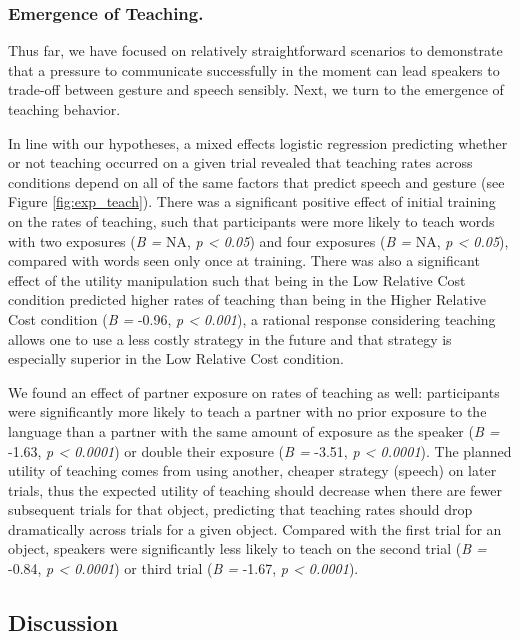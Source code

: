 \documentclass[english,,man,floatsintext]{apa6}
\begin{document}
\hypertarget{emergence-of-teaching.}{%
\subsubsection{Emergence of Teaching.}\label{emergence-of-teaching.}}

Thus far, we have focused on relatively straightforward scenarios to demonstrate that a pressure to communicate successfully in the moment can lead speakers to trade-off between gesture and speech sensibly. Next, we turn to the emergence of teaching behavior.

In line with our hypotheses, a mixed effects logistic regression predicting whether or not teaching occurred on a given trial revealed that teaching rates across conditions depend on all of the same factors that predict speech and gesture (see Figure \ref{fig:exp_teach}). There was a significant positive effect of initial training on the rates of teaching, such that participants were more likely to teach words with two exposures (\emph{B =} NA, \emph{p \textless{} 0.05}) and four exposures (\emph{B =} NA, \emph{p \textless{} 0.05}), compared with words seen only once at training. There was also a significant effect of the utility manipulation such that being in the Low Relative Cost condition predicted higher rates of teaching than being in the Higher Relative Cost condition (\emph{B =} -0.96, \emph{p \textless{} 0.001}), a rational response considering teaching allows one to use a less costly strategy in the future and that strategy is especially superior in the Low Relative Cost condition.

We found an effect of partner exposure on rates of teaching as well: participants were significantly more likely to teach a partner with no prior exposure to the language than a partner with the same amount of exposure as the speaker (\emph{B =} -1.63, \emph{p \textless{} 0.0001}) or double their exposure (\emph{B =} -3.51, \emph{p \textless{} 0.0001}). The planned utility of teaching comes from using another, cheaper strategy (speech) on later trials, thus the expected utility of teaching should decrease when there are fewer subsequent trials for that object, predicting that teaching rates should drop dramatically across trials for a given object. Compared with the first trial for an object, speakers were significantly less likely to teach on the second trial (\emph{B =} -0.84, \emph{p \textless{} 0.0001}) or third trial (\emph{B =} -1.67, \emph{p \textless{} 0.0001}).

\hypertarget{discussion-1}{%
\subsection{Discussion}\label{discussion-1}}
\end{document}

